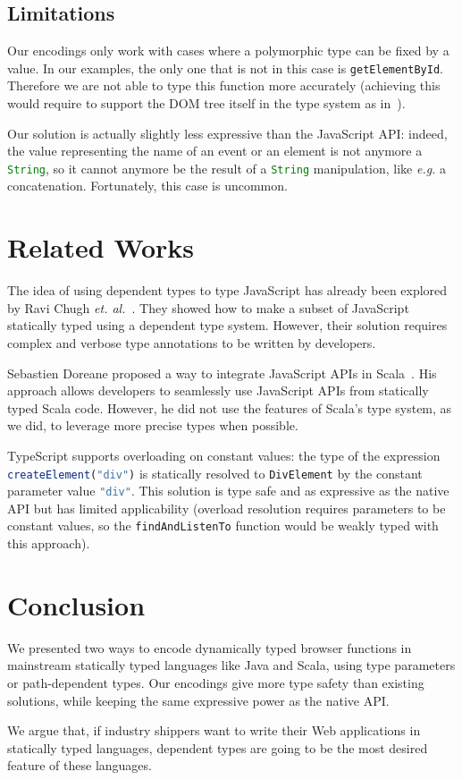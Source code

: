 \documentclass{llncs}
\newcommand{\jscode}[1]{\lstinline[language=JavaScript]|#1|}
\begin{document}
\subsection{Limitations}

Our encodings only work with cases where a polymorphic type can be fixed by a value. In our examples, the only one that is not in this case is \jscode{getElementById}. Therefore we are not able to type this function more accurately (achieving this would require to support the DOM tree itself in the type system as in~\cite{Lerner13_TypedJQuery}).

Our solution is actually slightly less expressive than the JavaScript API: indeed, the value representing the name of an event or an element is not anymore a \jscode{String}, so it cannot anymore be the result of a \jscode{String} manipulation, like \emph{e.g.} a concatenation. Fortunately, this case is uncommon.

\section{Related Works}
\label{sec-related}

The idea of using dependent types to type JavaScript has already been explored by Ravi Chugh \emph{et. al.}~\cite{Chugh12_DJS}. They showed how to make a subset of JavaScript statically typed using a dependent type system. However, their solution requires complex and verbose type annotations to be written by developers.

Sebastien Doreane proposed a way to integrate JavaScript APIs in Scala~\cite{Doeraene13_ScalaJs}. His approach allows developers to seamlessly use JavaScript APIs from statically typed Scala code. However, he did not use the features of Scala's type system, as we did, to leverage more precise types when possible.

TypeScript supports overloading on constant values: the type of the expression \jscode{createElement("div")} is statically resolved to \jscode{DivElement} by the constant parameter value \jscode{"div"}. This solution is type safe and as expressive as the native API but has limited applicability (overload resolution requires parameters to be constant values, so the \jscode{findAndListenTo} function would be weakly typed with this approach).

\section{Conclusion}
\label{sec-conclusion}

We presented two ways to encode dynamically typed browser functions in mainstream statically typed languages like Java and Scala, using type parameters or path-dependent types. Our encodings give more type safety than existing solutions, while keeping the same expressive power as the native API.

We argue that, if industry shippers want to write their Web applications in statically typed languages, dependent types are going to be the most desired feature of these languages.



\end{document}
